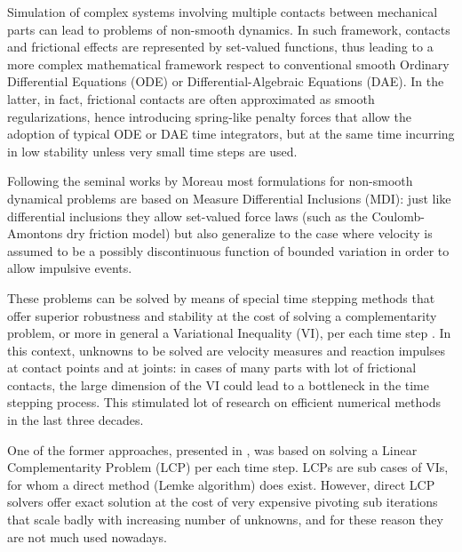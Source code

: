 \documentclass{svproc}
\begin{document}
Simulation of complex systems involving multiple contacts between mechanical parts can lead to problems of non-smooth dynamics. In such framework, contacts and frictional effects are represented by set-valued functions, thus leading to a more complex mathematical framework respect to conventional smooth Ordinary Differential Equations (ODE) or Differential-Algebraic Equations (DAE). In the latter, in fact, frictional contacts are often approximated as smooth regularizations, hence introducing spring-like penalty forces that allow the adoption of typical ODE or DAE time integrators, but at the same time incurring in low stability unless very small time steps are used.


Following the seminal works by Moreau 
\cite{mor88,Jean1992} 
most formulations for non-smooth dynamical problems are based on Measure Differential Inclusions (MDI): just like differential inclusions they allow set-valued force laws (such as the Coulomb-Amontons dry friction model) but also generalize to the case where velocity is assumed to be a possibly discontinuous function of bounded variation in order to allow impulsive events.

These problems can be solved by means of special time stepping methods that offer superior robustness and stability at the cost of solving a complementarity problem, or more in general a Variational Inequality (VI), per each time step
 \cite{acary2008numerical}. 
In this context, unknowns to be solved are velocity measures and reaction impulses at contact points and at joints: in cases of many parts with lot of frictional contacts, the large dimension of the VI could lead to a bottleneck in the time stepping process. This stimulated lot of research on efficient numerical methods in the last three decades.  

One of the former approaches, presented in 
\cite{StTr95}  %
, was based on solving a Linear Complementarity Problem (LCP) per each time step. LCPs are sub cases of VIs, for whom a direct method (Lemke algorithm) does exist. However, direct LCP solvers offer exact solution at the cost of very expensive pivoting sub iterations that scale badly with increasing number of unknowns, and for these reason they are not much used nowadays.
\end{document}
